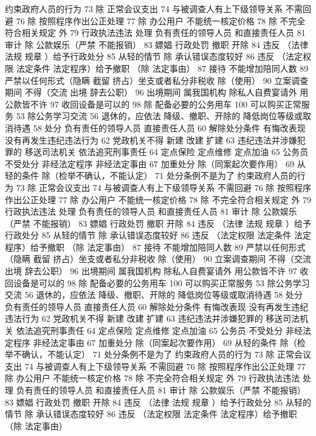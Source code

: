 \documentclass[cyan]{elegantnote}
\begin{document}
约束政府人员的行为
73 除 正常会议支出
74 与被调查人有上下级领导关系 不需回避
76 除 按照程序作出公正处理
77 除 办公用户
不能统一核定价格
78 除 不完全符合相关规定 外
79 行政执法违法 处理
负有责任的领导人员
和直接责任人员
81 审计
除 公款娱乐（严禁 不能报销）
83 嫖娼 行政处罚
撤职 开除
84 违反 （法律 法规 规章 ）给予行政处分
85 从轻的情节
除 承认错误态度较好
86 违反 （法定权限 法定条件 法定程序）给予撤职
（除 法定事由）
87 接待 不能增加陪同人数
89 严禁以任何形式（隐瞒 截留 挤占）坐支或者私分非税收
除（使用）
90 立案调查期间 不得（交流 出境 辞去公职）
96 出境期间 属我国机构 除私人自费宴请外 用公款皆不许
97 收回设备是可以的
98 除 配备必要的公务用车
100 可以购买正常服务
53 除公务学习交流
56 退休的，应依法
降级、撤职、开除的 降低岗位等级或取消待遇
58 处分
负有责任的领导人员
直接责任人员
60 解除处分条件
有悔改表现
没有再发生违纪违法行为
62 党政机关不得
新建 改建 扩建
63 违纪违法并涉嫌犯罪的
移送司法机关
依法追究刑事责任
64 定点保险 定点维修 定点加油
65 公务员 不受处分
非经法定程序
非经法定事由
67 加重处分
除（同案起次要作用）
69 从轻的条件
除（检举不确认，不能认定）
71 处分条例不是为了
约束政府人员的行为
73 除 正常会议支出
74 与被调查人有上下级领导关系 不需回避
76 除 按照程序作出公正处理
77 除 办公用户
不能统一核定价格
78 除 不完全符合相关规定 外
79 行政执法违法 处理
负有责任的领导人员
和直接责任人员
81 审计
除 公款娱乐（严禁 不能报销）
83 嫖娼 行政处罚
撤职 开除
84 违反 （法律 法规 规章 ）给予行政处分
85 从轻的情节
除 承认错误态度较好
86 违反 （法定权限 法定条件 法定程序）给予撤职
（除 法定事由）
87 接待 不能增加陪同人数
89 严禁以任何形式（隐瞒 截留 挤占）坐支或者私分非税收
除（使用）
90 立案调查期间 不得（交流 出境 辞去公职）
96 出境期间 属我国机构 除私人自费宴请外 用公款皆不许
97 收回设备是可以的
98 除 配备必要的公务用车
100 可以购买正常服务
53 除公务学习交流
56 退休的，应依法
降级、撤职、开除的 降低岗位等级或取消待遇
58 处分
负有责任的领导人员
直接责任人员
60 解除处分条件
有悔改表现
没有再发生违纪违法行为
62 党政机关不得
新建 改建 扩建
63 违纪违法并涉嫌犯罪的
移送司法机关
依法追究刑事责任
64 定点保险 定点维修 定点加油
65 公务员 不受处分
非经法定程序
非经法定事由
67 加重处分
除（同案起次要作用）
69 从轻的条件
除（检举不确认，不能认定）
71 处分条例不是为了
约束政府人员的行为
73 除 正常会议支出
74 与被调查人有上下级领导关系 不需回避
76 除 按照程序作出公正处理
77 除 办公用户
不能统一核定价格
78 除 不完全符合相关规定 外
79 行政执法违法 处理
负有责任的领导人员
和直接责任人员
81 审计
除 公款娱乐（严禁 不能报销）
83 嫖娼 行政处罚
撤职 开除
84 违反 （法律 法规 规章 ）给予行政处分
85 从轻的情节
除 承认错误态度较好
86 违反 （法定权限 法定条件 法定程序）给予撤职
（除 法定事由）
\end{document}
